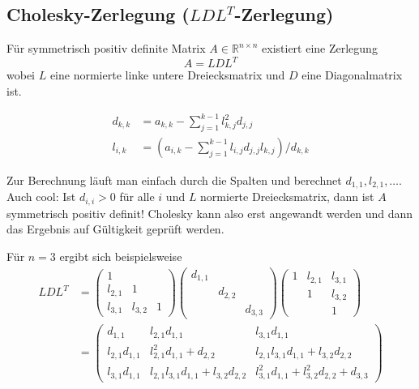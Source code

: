 \documentclass{panikzettel}
\begin{document}
\subsection[Cholesky-Zerlegung]{Cholesky-Zerlegung ($LDL^T$-Zerlegung)}

\begin{minipage}[t]{0.5\textwidth}
Für symmetrisch positiv definite Matrix $A \in \mathbb{R}^{n \times n}$ existiert eine Zerlegung
\[A = LDL^T\]
wobei $L$ eine normierte linke untere Dreiecksmatrix und $D$ eine Diagonalmatrix ist.
\end{minipage}
\begin{minipage}[t]{0.5\textwidth}
\vspace{-2em}
\begin{align*}
  d_{k,k} &= a_{k,k} - \sum_{j=1}^{k-1} l_{k,j}^2 d_{j,j} \\
  l_{i,k} &= \left( a_{i,k} - \sum_{j=1}^{k-1} l_{i,j} d_{j,j} l_{k,j} \right) / d_{k,k}
\end{align*}
\end{minipage}

Zur Berechnung läuft man einfach durch die Spalten und berechnet $d_{1,1}, l_{2,1}, \ldots$. Auch cool: Ist $d_{i,i} > 0$ für alle $i$ und $L$ normierte Dreiecksmatrix, dann ist $A$ symmetrisch positiv definit! Cholesky kann also erst angewandt werden und dann das Ergebnis auf Gültigkeit geprüft werden.

Für $n = 3$ ergibt sich beispielsweise
\begin{align*}
LDL^T &= \begin{pmatrix}
	1	\\
    l_{2,1}	&	1	\\
    l_{3,1}	&	l_{3,2}	&	1
\end{pmatrix} \begin{pmatrix}
	d_{1,1}	\\
    	&	d_{2,2}	\\
        &	&	d_{3,3}
\end{pmatrix} \begin{pmatrix}
	1	&	l_{2,1}	&	l_{3,1}	\\
    	&	1	&	l_{3,2}	\\
    	&	&	1
\end{pmatrix}	\\
&= \begin{pmatrix}
	d_{1,1}	&	l_{2,1}d_{1,1}	&	l_{3,1}d_{1,1}	\\
    l_{2,1}d_{1,1}	&	l_{2,1}^2d_{1,1} + d_{2,2}	&	l_{2,1}l_{3,1}d_{1,1}+l_{3,2}d_{2,2}	\\
    l_{3,1}d_{1,1}	&	l_{2,1}l_{3,1}d_{1,1}+l_{3,2}d_{2,2}	&	l_{3,1}^2d_{1,1} + l_{3,2}^2d_{2,2} + d_{3,3}
\end{pmatrix}
\end{align*}
\end{document}
